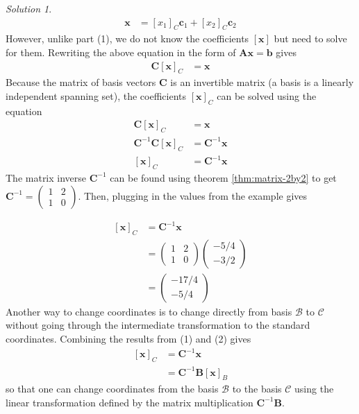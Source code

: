 \documentclass[
]{book}
\theoremstyle{definition}
\theoremstyle{definition}
\theoremstyle{definition}
\theoremstyle{definition}
\theoremstyle{remark}
\newtheorem*{solution}{Solution}
\begin{document}
\begin{solution}
\[
\begin{aligned}
\mathbf{x} & = \left[x_1\right]_C \mathbf{c}_1 + \left[x_2\right]_C \mathbf{c}_2
\end{aligned}
\]
However, unlike part (1), we do not know the coefficients \(\left[\mathbf{x}\right]\) but need to solve for them. Rewriting the above equation in the form of \(\mathbf{A}\mathbf{x} = \mathbf{b}\) gives
\[
\begin{aligned}
\mathbf{C} \left[ \mathbf{x} \right]_C & = \mathbf{x}
\end{aligned}
\]
Because the matrix of basis vectors \(\mathbf{C}\) is an invertible matrix (a basis is a linearly independent spanning set), the coefficients \(\left[\mathbf{x}\right]_C\) can be solved using the equation
\[
\begin{aligned}
\mathbf{C} \left[ \mathbf{x} \right]_C & = \mathbf{x} \\
\mathbf{C}^{-1} \mathbf{C}\left[ \mathbf{x} \right]_C & = \mathbf{C}^{-1}\mathbf{x} \\
\left[ \mathbf{x} \right]_C & = \mathbf{C}^{-1} \mathbf{x} 
\end{aligned}
\]
The matrix inverse \(\mathbf{C}^{-1}\) can be found using theorem \ref{thm:matrix-2by2} to get \(\mathbf{C}^{-1} = \begin{pmatrix} 1 & 2 \\ 1 & 0 \end{pmatrix}\). Then, plugging in the values from the example gives

\[
\begin{aligned}
\left[ \mathbf{x} \right]_C & = \mathbf{C}^{-1} \mathbf{x} \\
& = \begin{pmatrix} 1 & 2 \\ 1 & 0 \end{pmatrix} \begin{pmatrix} -5/4 \\ -3/2 \end{pmatrix} \\
& = \begin{pmatrix} -17/4 \\ -5/4 \end{pmatrix}
\end{aligned}
\]
Another way to change coordinates is to change directly from basis \(\mathcal{B}\) to \(\mathcal{C}\) without going through the intermediate transformation to the standard coordinates. Combining the results from (1) and (2) gives
\[
\begin{aligned}
\left[ \mathbf{x} \right]_C & = \mathbf{C}^{-1} \mathbf{x} \\
& = \mathbf{C}^{-1} \mathbf{B} \left[\mathbf{x}\right]_B
\end{aligned}
\]
so that one can change coordinates from the basis \(\mathcal{B}\) to the basis \(\mathcal{C}\) using the linear transformation defined by the matrix multiplication \(\mathbf{C}^{-1} \mathbf{B}\).


\end{solution}
\end{document}
